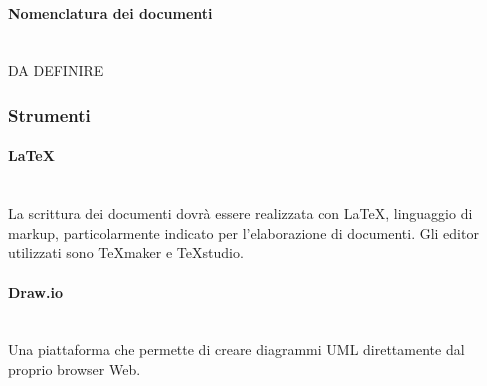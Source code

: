 \paragraph{Nomenclatura dei documenti}\mbox{} \\
DA DEFINIRE

\subsubsection{Strumenti}

\paragraph{\LaTeX}\mbox{} \\
La scrittura dei documenti dovrà essere realizzata con \LaTeX ,  linguaggio di markup,  particolarmente  indicato  per  l'elaborazione  di  documenti.
Gli editor utilizzati sono \TeX maker e \TeX studio.

\paragraph{Draw.io}\mbox{} \\
Una piattaforma che permette di creare diagrammi UML direttamente dal proprio browser Web.


